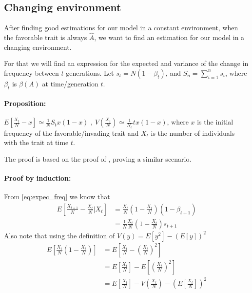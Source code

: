 \documentclass[11pt]{article}
\begin{document}
\subsection{Changing environment}
After finding good estimations for our model in a constant environment, when the favorable trait is always $\hat{A}$, we want to find an estimation for our model in a changing environment.

For that we will find an expression for the expected and variance of the change in frequency between $t$ generations.
Let $s_t=N(1-\beta_t)$, and $S_n=\sum\limits_{i=1}^n s_i$, where $\beta_t$ is $\beta(A)$ at time/generation $t$.


\paragraph{Proposition:} $E[\frac{X_t}{N}-x]\simeq \frac{1}{N}S_tx(1-x)$ , $V(\frac{X_t}{N})\simeq\frac{1}{N_e}tx(1-x)$, where $x$ is the initial frequency of the favorable/invading trait and $X_t$ is the number of individuals with the trait at time $t$.

The proof is based on the proof of \citet{changeEnv}, proving a similar scenario.
\paragraph{Proof by induction:}
From \cref{eq:expec_freq} we know that
\begin{equation}\label{eq:ch_1}
\begin{split}
E\left[\frac{X_{t+1}}{N}-\frac{X_t}{N}\bigg|X_t\right] &= \frac{X_t}{N}\left(1-\frac{X_t}{N}\right)(1-\beta_{t+1}) \\
&= \frac{1}{N}\frac{X_t}{N}\left(1-\frac{X_t}{N}\right)s_{t+1}
\end{split}
\end{equation}
Also note that using the definition of $V(y)=E[y^2]-(E[y])^2$
\begin{equation}
\begin{split}
E\left[\frac{X_t}{N}\left(1-\frac{X_t}{N}\right)\right] &= E\left[\frac{X_t}{N}-\left(\frac{X_t}{N}\right)^2\right] \\
&= E\left[\frac{X_t}{N}\right]-E\left[\left(\frac{X_t}{N}\right)^2\right] \\
&= E\left[\frac{X_t}{N}\right] - V\left(\frac{X_t}{N}\right) - \left(E\left[\frac{X_t}{N}\right]\right)^2
\end{split}
\end{equation}
\end{document}
